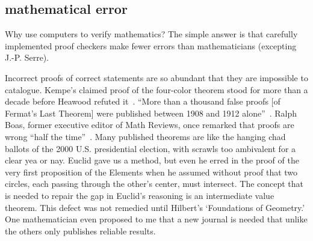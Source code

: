 \documentclass{llncs}
\begin{document}
 


\subsection{mathematical error}

Why use computers to verify mathematics?  The simple answer is that
carefully implemented proof checkers make fewer errors than
mathematicians (excepting J.-P. Serre).

Incorrect proofs of correct statements are so abundant that they are
impossible to catalogue.  Kempe's claimed proof of the four-color
theorem stood for more than a decade before Heawood refuted
it~\cite[p.~115]{Mac}.  ``More than a thousand false proofs [of
Fermat's Last Theorem] were published between 1908 and 1912
alone''~\cite{Corry}.  Ralph Boas, former executive editor of Math
Reviews, once remarked that proofs are wrong ``half the
time''~\cite{Aus}.  Many published theorems are like the hanging chad
ballots of the 2000 U.S. presidential election, with scrawls too
ambivalent for a clear yea or nay.  Euclid gave us a method, but even
he erred in the proof of the very first proposition of the Elements
when he assumed without proof that two circles, each passing through
the other's center, must intersect.  The concept that is needed to
repair the gap in Euclid's reasoning is an intermediate value theorem.
This defect was not remedied until Hilbert's `Foundations of
Geometry.'  One mathematician even proposed to me that a new journal
is needed that unlike the
others %
only publishes reliable results.

\end{document}
